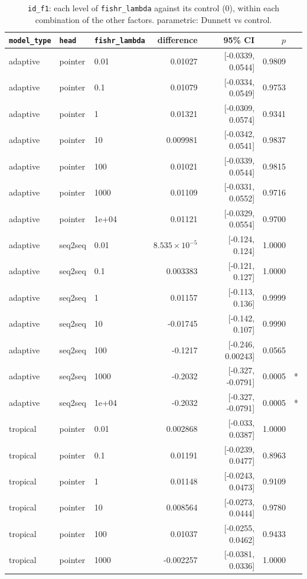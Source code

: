 \documentclass[10pt]{article}
\begin{document}
{\small
\begin{longtable}{lllrrrl}
\caption{\texttt{id\_f1}: each level of \texttt{fishr\_lambda} against its control (0), within each combination of the other factors. parametric: Dunnett vs control.}\label{tab:control-id_f1}\\
\toprule
\texttt{model\_type} & \texttt{head} & \texttt{fishr\_lambda} & difference & 95\% CI & $p$ & \\
\midrule
\endhead
adaptive & pointer & 0.01 & 0.01027 & [-0.0339, 0.0544] & 0.9809 & \\
adaptive & pointer & 0.1 & 0.01079 & [-0.0334, 0.0549] & 0.9753 & \\
adaptive & pointer & 1 & 0.01321 & [-0.0309, 0.0574] & 0.9341 & \\
adaptive & pointer & 10 & 0.009981 & [-0.0342, 0.0541] & 0.9837 & \\
adaptive & pointer & 100 & 0.01021 & [-0.0339, 0.0544] & 0.9815 & \\
adaptive & pointer & 1000 & 0.01109 & [-0.0331, 0.0552] & 0.9716 & \\
adaptive & pointer & 1e+04 & 0.01121 & [-0.0329, 0.0554] & 0.9700 & \\
adaptive & seq2seq & 0.01 & $8.535\times10^{-5}$ & [-0.124, 0.124] & 1.0000 & \\
adaptive & seq2seq & 0.1 & 0.003383 & [-0.121, 0.127] & 1.0000 & \\
adaptive & seq2seq & 1 & 0.01157 & [-0.113, 0.136] & 0.9999 & \\
adaptive & seq2seq & 10 & -0.01745 & [-0.142, 0.107] & 0.9990 & \\
adaptive & seq2seq & 100 & -0.1217 & [-0.246, 0.00243] & 0.0565 & \\
adaptive & seq2seq & 1000 & -0.2032 & [-0.327, -0.0791] & 0.0005 & *\\
adaptive & seq2seq & 1e+04 & -0.2032 & [-0.327, -0.0791] & 0.0005 & *\\
tropical & pointer & 0.01 & 0.002868 & [-0.033, 0.0387] & 1.0000 & \\
tropical & pointer & 0.1 & 0.01191 & [-0.0239, 0.0477] & 0.8963 & \\
tropical & pointer & 1 & 0.01148 & [-0.0243, 0.0473] & 0.9109 & \\
tropical & pointer & 10 & 0.008564 & [-0.0273, 0.0444] & 0.9780 & \\
tropical & pointer & 100 & 0.01037 & [-0.0255, 0.0462] & 0.9433 & \\
tropical & pointer & 1000 & -0.002257 & [-0.0381, 0.0336] & 1.0000 & \\

\end{longtable}}
\end{document}

